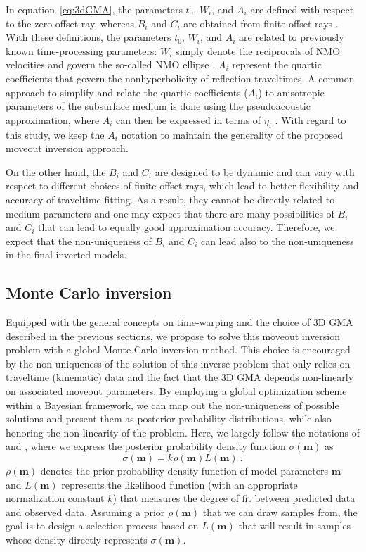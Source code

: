 In equation~\ref{eq:3dGMA}, the parameters $t_0$, $W_i$, and $A_i$ are defined with respect to the zero-offset ray, whereas $B_i$ and $C_i$ are obtained from finite-offset rays \cite[]{zonegma}. With these definitions, the parameters $t_0$, $W_i$, and $A_i$ are related to previously known time-processing parameters: $W_i$ simply denote the reciprocals of NMO velocities and govern the so-called NMO ellipse \cite[]{nmoellipse}. $A_i$ represent the quartic coefficients that govern the nonhyperbolicity of reflection traveltimes. A common approach to simplify and relate the quartic coefficients ($A_i$) to anisotropic parameters of the subsurface medium is done using the pseudoacoustic approximation, where $A_i$ can then be expressed in terms of $\eta_i$ \cite[]{alkatsvankin,alkaortho,stovasortho,zoneinterval,zonegma}. With regard to this study, we keep the $A_i$ notation to maintain the generality of the proposed moveout inversion approach.

On the other hand, the $B_i$ and $C_i$ are designed to be dynamic and can vary with respect to different choices of finite-offset rays, which lead to better flexibility and accuracy of traveltime fitting. As a result, they cannot be directly related to medium parameters and one may expect that there are many possibilities of $B_i$ and $C_i$ that can lead to equally good approximation accuracy. Therefore, we expect that the non-uniqueness of $B_i$ and $C_i$ can lead also to the non-uniqueness in the final inverted models.

\subsection{Monte Carlo inversion}

Equipped with the general concepts on time-warping and the choice of 3D GMA described in the previous sections, we propose to solve this moveout inversion problem with a global Monte Carlo inversion method. This choice is encouraged by the non-uniqueness of the solution of this inverse problem that only relies on traveltime (kinematic) data and the fact that the 3D GMA depends non-linearly on associated moveout parameters. By employing a global optimization scheme within a Bayesian framework, we can map out the non-uniqueness of possible solutions and present them as posterior probability distributions, while also honoring the non-linearity of the problem. Here, we largely follow the notations of \cite{mosetaran} and \cite{tarantolabook}, where we express the posterior probability density function $\sigma(\mathbf{m})$ as
\begin{equation}
\label{eq:bayes}
    \sigma(\mathbf{m}) = k\rho(\mathbf{m}) L(\mathbf{m})~.
\end{equation}
$\rho(\mathbf{m})$ denotes the prior probability density function of model parameters $\mathbf{m}$ and $L(\mathbf{m})$ represents the likelihood function (with an appropriate normalization constant $k$) that measures the degree of fit between predicted data and observed data. Assuming a prior $\rho(\mathbf{m})$ that we can draw samples from, the goal is to design a selection process based on $L(\mathbf{m})$ that will result in samples whose density directly represents $\sigma(\mathbf{m})$. 


